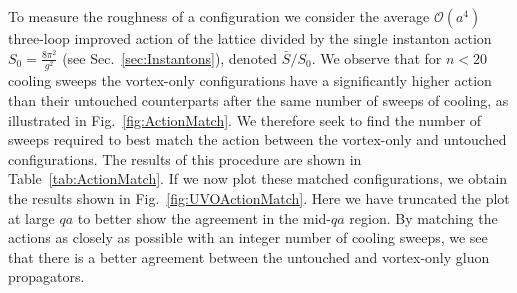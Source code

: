 To measure the roughness of a configuration we consider the average $\mathcal{O}(a^4)$ three-loop improved action of the lattice divided by the single instanton action $S_0=\frac{8\pi^2}{g^2}$ (see Sec.~\ref{sec:Instantons}), denoted $\bar{S}/S_0$. We observe that for $n<20$ cooling sweeps the vortex-only configurations have a significantly higher action than their untouched counterparts after the same number of sweeps of cooling, as illustrated in Fig.~\ref{fig:ActionMatch}. We therefore seek to find the number of sweeps required to best match the action between the vortex-only and untouched configurations. The results of this procedure are shown in Table~\ref{tab:ActionMatch}. If we now plot these matched configurations, we obtain the results shown in Fig.~\ref{fig:UVOActionMatch}. Here we have truncated the plot at large $qa$ to better show the agreement in the mid-$qa$ region. By matching the actions as closely as possible with an integer number of cooling sweeps, we see that there is a better agreement between the untouched and vortex-only gluon propagators.\\

